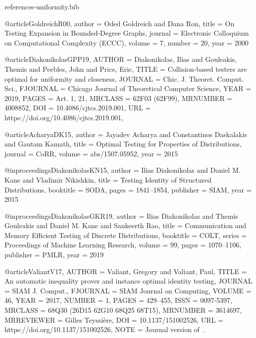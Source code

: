 \documentclass[10pt]{article}
\begin{document}
\begin{filecontents}{references-uniformity.bib}

@article{GoldreichR00,
  author    = {Oded Goldreich and
               Dana Ron},
  title     = {On Testing Expansion in Bounded-Degree Graphs},
  journal   = {Electronic Colloquium on Computational Complexity {(ECCC)}},
  volume    = {7},
  number    = {20},
  year      = {2000}
}

@article{DiakonikolasGPP19,
    AUTHOR = {Diakonikolas, Ilias and Gouleakis, Themis and Peebles, John
              and Price, Eric},
     TITLE = {Collision-based testers are optimal for uniformity and
              closeness},
   JOURNAL = {Chic. J. Theoret. Comput. Sci.},
  FJOURNAL = {Chicago Journal of Theoretical Computer Science},
      YEAR = {2019},
     PAGES = {Art. 1, 21},
   MRCLASS = {62F03 (62F99)},
  MRNUMBER = {4008852},
       DOI = {10.4086/cjtcs.2019.001},
       URL = {https://doi.org/10.4086/cjtcs.2019.001},
}

@article{AcharyaDK15,
  author    = {Jayadev Acharya and
               Constantinos Daskalakis and
               Gautam Kamath},
  title     = {Optimal Testing for Properties of Distributions},
  journal   = {CoRR},
  volume    = {abs/1507.05952},
  year      = {2015}
}

@inproceedings{DiakonikolasKN15,
  author    = {Ilias Diakonikolas and
               Daniel M. Kane and
               Vladimir Nikishkin},
  title     = {Testing Identity of Structured Distributions},
  booktitle = {{SODA}},
  pages     = {1841--1854},
  publisher = {{SIAM}},
  year      = {2015}
}

@inproceedings{DiakonikolasGKR19,
  author    = {Ilias Diakonikolas and
               Themis Gouleakis and
               Daniel M. Kane and
               Sankeerth Rao},
  title     = {Communication and Memory Efficient Testing of Discrete Distributions},
  booktitle = {{COLT}},
  series    = {Proceedings of Machine Learning Research},
  volume    = {99},
  pages     = {1070--1106},
  publisher = {{PMLR}},
  year      = {2019}
}

@article{ValiantV17,
    AUTHOR = {Valiant, Gregory and Valiant, Paul},
     TITLE = {An automatic inequality prover and instance optimal identity
              testing},
   JOURNAL = {SIAM J. Comput.},
  FJOURNAL = {SIAM Journal on Computing},
    VOLUME = {46},
      YEAR = {2017},
    NUMBER = {1},
     PAGES = {429--455},
      ISSN = {0097-5397},
   MRCLASS = {68Q30 (26D15 62G10 68Q25 68T15)},
  MRNUMBER = {3614697},
MRREVIEWER = {Gilles Teyssi\`ere},
       DOI = {10.1137/151002526},
       URL = {https://doi.org/10.1137/151002526},
      NOTE = {Journal version of~\cite{ValiantValiant14}.}
}


\end{filecontents}
\end{document}
